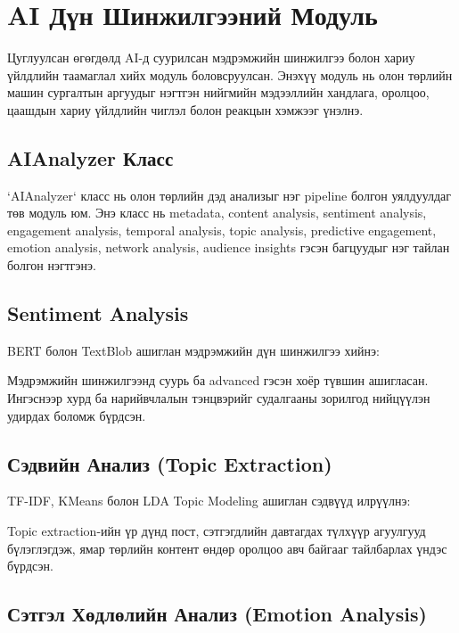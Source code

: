\documentclass[12pt,a4paper]{report}
\begin{document}
\section{AI Дүн Шинжилгээний Модуль}

Цуглуулсан өгөгдөлд AI-д суурилсан мэдрэмжийн шинжилгээ болон хариу үйлдлийн таамаглал хийх модуль боловсруулсан. Энэхүү модуль нь олон төрлийн машин сургалтын аргуудыг нэгтгэн нийгмийн мэдээллийн хандлага, оролцоо, цаашдын хариу үйлдлийн чиглэл болон реакцын хэмжээг үнэлнэ.

\subsection{AIAnalyzer Класс}

`AIAnalyzer` класс нь олон төрлийн дэд анализыг нэг pipeline болгон уялдуулдаг төв модуль юм. Энэ класс нь metadata, content analysis, sentiment analysis, engagement analysis, temporal analysis, topic analysis, predictive engagement, emotion analysis, network analysis, audience insights гэсэн багцуудыг нэг тайлан болгон нэгтгэнэ.


\subsection{Sentiment Analysis}

BERT болон TextBlob ашиглан мэдрэмжийн дүн шинжилгээ хийнэ:

Мэдрэмжийн шинжилгээнд суурь ба advanced гэсэн хоёр түвшин ашигласан. Ингэснээр хурд ба нарийвчлалын тэнцвэрийг судалгааны зорилгод нийцүүлэн удирдах боломж бүрдсэн.


\subsection{Сэдвийн Анализ (Topic Extraction)}

TF-IDF, KMeans болон LDA Topic Modeling ашиглан сэдвүүд илрүүлнэ:

Topic extraction-ийн үр дүнд пост, сэтгэгдлийн давтагдах түлхүүр агуулгууд бүлэглэгдэж, ямар төрлийн контент өндөр оролцоо авч байгааг тайлбарлах үндэс бүрдсэн.


\subsection{Сэтгэл Хөдлөлийн Анализ (Emotion Analysis)}
\end{document}
